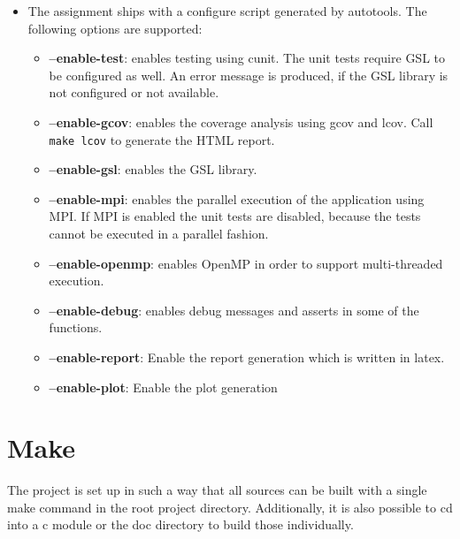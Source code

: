 \documentclass[12pt,a4paper]{report}
\begin{document}
\begin{itemize}
\item The assignment ships with a configure script generated by
  autotools. The following options are supported:
  \begin{itemize}
  \item \textbf{--enable-test}: enables testing using cunit. The unit tests
    require GSL to be configured as well. An error message is
    produced, if the GSL library is not configured or not available.
  \item \textbf{--enable-gcov}: enables the coverage analysis using gcov and
    lcov. Call \verb=make lcov= to generate the HTML report.
  \item \textbf{--enable-gsl}: enables the GSL library.
  \item \textbf{--enable-mpi}: enables the parallel execution of the
    application using MPI. If MPI is enabled the unit tests are
    disabled, because the tests cannot be executed in a parallel fashion.
  \item \textbf{--enable-openmp}: enables OpenMP in order to support
    multi-threaded execution.
  \item \textbf{--enable-debug}: enables debug messages and asserts in some of
    the functions.
  \item \textbf{--enable-report}: Enable the report generation which is
    written in latex.
  \item \textbf{--enable-plot}: Enable the plot generation
  \end{itemize}
\end{itemize}

\section{Make}
\label{sec:make}

The project is set up in such a way that all sources can be built with
a single make command in the root project directory. Additionally, it
is also possible to cd into a c module or the doc directory to
build those individually.
\end{document}
